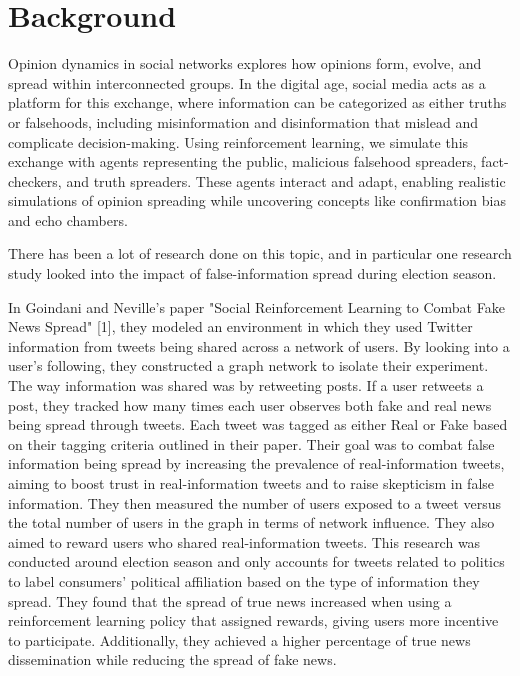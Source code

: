 \documentclass[twoside]{article}
\begin{document}
\section{Background}
Opinion dynamics in social networks explores how opinions form, evolve, and spread within interconnected groups. In the digital age, social media acts as a platform for this exchange, where information can be categorized as either truths or falsehoods, including misinformation and disinformation that mislead and complicate decision-making. Using reinforcement learning, we simulate this exchange with agents representing the public, malicious falsehood spreaders, fact-checkers, and truth spreaders. These agents interact and adapt, enabling realistic simulations of opinion spreading while uncovering concepts like confirmation bias and echo chambers.

There has been a lot of research done on this topic, and in particular one research study looked into the impact of false-information spread during election season.

In Goindani and Neville's paper "Social Reinforcement Learning to Combat Fake News Spread" [1], they modeled an environment in which they used Twitter information from tweets being shared across a network of users. By looking into a user's following, they constructed a graph network to isolate their experiment. The way information was shared was by retweeting posts. If a user retweets a post, they tracked how many times each user observes both fake and real news being spread through tweets. Each tweet was tagged as either Real or Fake based on their tagging criteria outlined in their paper. Their goal was to combat false information being spread by increasing the prevalence of real-information tweets, aiming to boost trust in real-information tweets and to raise skepticism in false information. They then measured the number of users exposed to a tweet versus the total number of users in the graph in terms of network influence. They also aimed to reward users who shared real-information tweets. This research was conducted around election season and only accounts for tweets related to politics to label consumers' political affiliation based on the type of information they spread. They found that the spread of true news increased when using a reinforcement learning policy that assigned rewards, giving users more incentive to participate. Additionally, they achieved a higher percentage of true news dissemination while reducing the spread of fake news.
\end{document}
